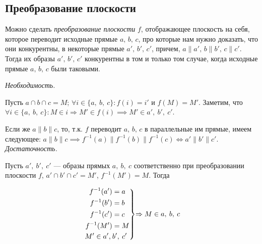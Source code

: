 \documentclass[14pt]{extarticle}
\theoremstyle{definition}
\theoremstyle{theorem}
\renewenvironment{rcases}
  {\left.\begin{aligned}}
  {\end{aligned}\right\rbrace}
\begin{document}
\subsection{Преобразование плоскости}
Можно сделать \textit{преобразование плоскости} $f$, отображающее плоскость на себя,
которое переводит исходные прямые \(a, \, b, \, c\), про которые нам нужно доказать,
что они конкурентны, в некоторые прямые \(a', \, b', \, c'\), причем,
\(a \parallel a', \, b \parallel b', \, c \parallel c'\).
Тогда их образы \(a', \, b', \, c'\) конкурентны в том и только том случае,
когда исходные прямые \(a, \, b, \, c\) были таковыми.

\textit{Необходимость.}

Пусть $a \cap b \cap c = M$; $\forall i \in \{a, \: b, \: c\} \mathpunct{:} f(i) = i'$ 
и $f(M) = M'$. Заметим, что $\forall i \in \{a, \: b, \: c\} \mathpunct{:} M \in i 
\Rightarrow M' \in f(i) \implies M' \in a', \:  b', \: c'$. 

Если же $a \parallel b \parallel c$, то, т.к. $f$ переводит \(a, \, b, \, c\)
в параллельные им прямые, имеем следующее: \(a \parallel b \parallel c \implies
f^{-1}(a) \parallel f^{-1}(b) \parallel f^{-1}(c) \iff a' \parallel b' \parallel
c'\).\\


\textit{Достаточность.}

Пусть $a', \: b', \: c'$ --- образы прямых $a, \: b, \: c$ соответственно при
преобразовании плоскости $f$, $a' \cap b' \cap c' = M'$,
$f^{-1}(M') = M$. Тогда \\
\begin{ceqn}
\[
\begin{rcases}
	f^{-1}(a') &= a\\
	f^{-1}(b') &= b\\
	f^{-1}(c') &= c\\
	f^{-1}(M') &= M\\
	M' \in a', \: &b' , \: c' \\
\end{rcases}
\text{$\Rightarrow M \in a,\: b, \: c$}
\]
\end{ceqn}

\end{document}
